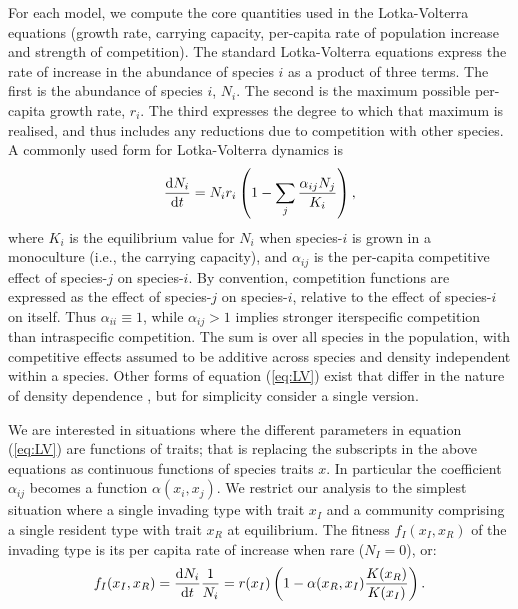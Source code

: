 \documentclass[a4paper,11pt]{article}
\begin{document}
For each model, we compute the core quantities used in the
Lotka-Volterra equations (growth rate, carrying capacity, per-capita
rate of population increase and strength of competition).  The
standard Lotka-Volterra equations express the rate of increase in the
abundance of species $i$ as a product of three terms.
%
The first is the abundance of species $i$, $N_i$.
%
The second is the maximum possible per-capita growth rate, $r_i$. The
third expresses the degree to which that maximum is realised, and
thus includes any reductions due to competition with other species. A
commonly used form for Lotka-Volterra dynamics is
%
\begin{equation}
\label{eq:LV}
\frac{\mathrm{d} N_i}{\mathrm{d} t} =
N_i r_i \left(1 - \sum_j \frac{\alpha_{ij} N_j}{K_i}\right),
\end{equation}
%
where $K_i$ is the equilibrium value for $N_i$ when species-$i$ is
grown in a monoculture (i.e., the carrying capacity), and
$\alpha_{ij}$ is the per-capita competitive effect of species-$j$ on
species-$i$.  By convention, competition functions are expressed as
the effect of species-$j$ on species-$i$, relative to the effect of
species-$i$ on itself. Thus $\alpha_{ii}\equiv 1$, while $\alpha_{ij}
>
1$ implies stronger iterspecific competition than intraspecific
competition.
The sum is over all species in the population, with
competitive effects assumed to be additive across species and density
independent within a species.
%
Other forms of equation (\ref{eq:LV}) exist that differ in the nature
of density dependence \citep[e.g.][]{Leimar-2013}, but for simplicity
consider a single version.

We are interested in situations where the different parameters in
equation (\ref{eq:LV}) are functions of traits; that is replacing the
subscripts in the above equations as continuous functions of species
traits $x$.  In particular the coefficient $\alpha_{ij}$ becomes a
function $\alpha(x_i, x_j)$.
%
We restrict our analysis to the simplest situation where a single
invading type with trait $x_I$ and a community comprising a single
resident type with trait $x_R$ at equilibrium.  The fitness $f_I(x_I,
x_R)$ of the invading type is its per capita rate of increase when
rare ($N_I = 0$), or:
%
\begin{equation}
  \label{eq:LVi}
   f_I(x_I, x_R) = \frac{\mathrm{d} N_i}{\mathrm{d} t} \frac{1}{N_i} =
    r(x_I)\left(1 - \alpha(x_R, x_I) \frac{K(x_R)}{K(x_I)}\right).
\end{equation}
%
\end{document}
